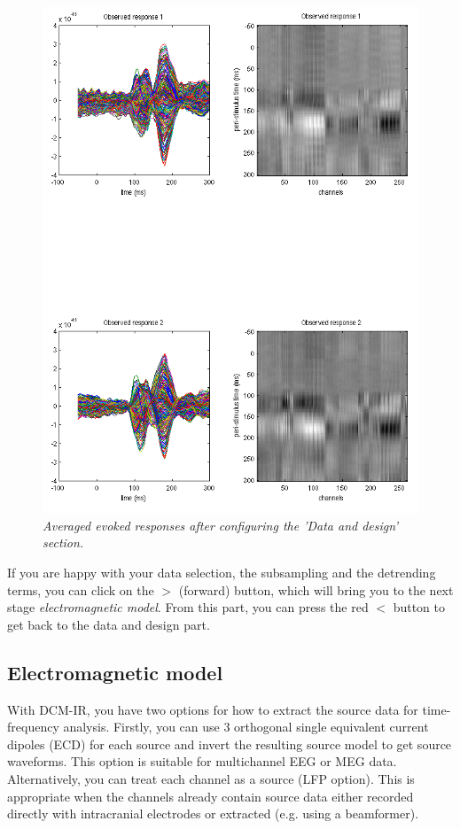 \begin{figure}
\begin{center}
\includegraphics[width=160mm]{dcm_ir/figures/irfigure2}
\caption{\em Averaged evoked responses after configuring the 'Data and design' section.\label{dcm-ir:fig:2}}
\end{center}
\end{figure}

If you are happy with your data selection, the subsampling and the detrending terms, you can click on the $>$ (forward) button, which will bring you to the next stage \textit{electromagnetic model}. From this part, you can press the red $<$ button to get back to the data and design part.

\subsection{Electromagnetic model}
With DCM-IR, you have two options for how to extract the source data for time-frequency analysis. Firstly, you can use 3 orthogonal single equivalent current dipoles (ECD) for each source and invert the resulting source model to get source waveforms. This option is suitable for multichannel EEG or MEG data. Alternatively, you can treat each channel as a source (LFP option). This is appropriate when the channels already contain source data either recorded directly with intracranial electrodes or extracted (e.g. using a beamformer). 

